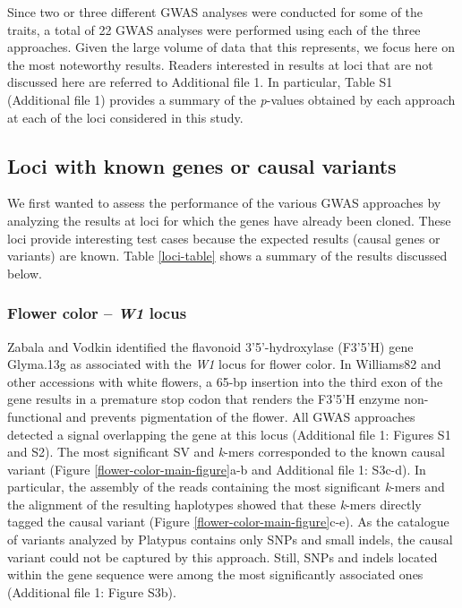 \documentclass[doublespacing]{bmcart}
\begin{document}
Since two or three different GWAS analyses were conducted for some of the
traits, a total of 22 GWAS analyses were performed using each of the three
approaches.  Given the large volume of data that this represents, we focus here
on the most noteworthy results. Readers interested in results at loci that are
not discussed here are referred to Additional file 1. In particular, Table
S1 (Additional file 1) provides a summary of the
\textit{p}-values obtained by each approach at each of the loci considered in
this study.

\subsection*{Loci with known genes or causal variants}

We first wanted to assess the performance of the various GWAS
approaches by analyzing the results at loci for which the genes have
already been cloned. These loci provide interesting test cases because
the expected results (causal genes or variants) are known. Table \ref{loci-table} shows
a summary of the results discussed below.

\subsubsection*{Flower color -- \textit{W1} locus}

Zabala and Vodkin \cite{zabala2007} identified the flavonoid 3’5’-hydroxylase (F3’5’H) gene
Glyma.13g as associated with the \textit{W1} locus for flower color. In
Williams82 and other accessions with white flowers, a 65-bp insertion into the
third exon of the gene results in a premature stop codon that renders the
F3’5’H enzyme non-functional and prevents pigmentation of the flower. All
GWAS approaches detected a signal overlapping the gene at this locus (Additional file 1: Figures
S1 and S2). The most
significant SV and \textit{k}-mers corresponded to the known causal variant
(Figure \ref{flower-color-main-figure}a-b and Additional file 1: S3c-d).
In particular, the assembly of the reads containing the most significant \textit{k}-mers
and the alignment of the resulting haplotypes showed that these \textit{k}-mers
directly tagged the causal variant (Figure \ref{flower-color-main-figure}c-e).
As the catalogue of variants analyzed by Platypus contains only SNPs and small
indels, the causal variant could not be captured by this approach. Still, SNPs
and indels located within the gene sequence were among the most significantly
associated ones (Additional file 1: Figure S3b).
\end{document}
